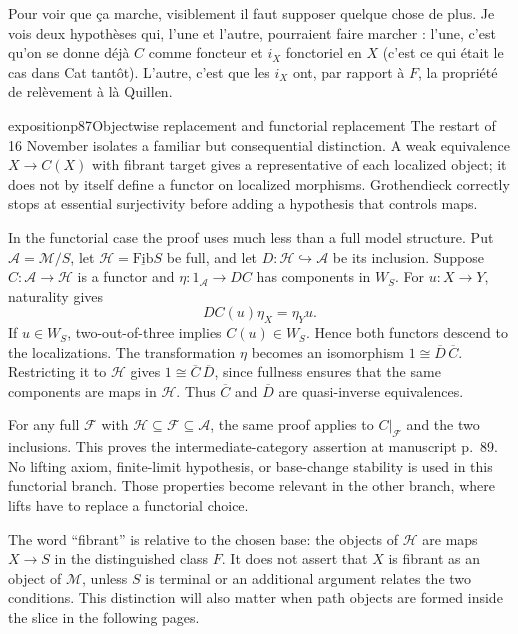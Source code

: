 Pour voir que ça marche, visiblement il faut supposer quelque chose de plus. Je vois deux
hypothèses qui, l'une et l'autre, pourraient faire marcher : l'une, c'est qu'on se donne
déjà $C$ comme foncteur et $i_X$ fonctoriel en $X$ (c'est ce qui était le cas dans Cat tantôt).
L'autre, c'est que
les $i_X$ ont, par rapport à $F$, la propriété de relèvement à là Quillen. %

\begin{dcomment}{exposition}{p87}{Objectwise replacement and functorial replacement}
The restart of 16 November isolates a familiar but consequential distinction. A weak equivalence $X\to C(X)$ with fibrant target gives a representative of each localized object; it does not by itself define a functor on localized morphisms. Grothendieck correctly stops at essential surjectivity before adding a hypothesis that controls maps.

In the functorial case the proof uses much less than a full model structure. Put $\mathcal A=\mathcal M/S$, let $\mathcal H=\underline{\mathrm{Fib}}S$ be full, and let $D:\mathcal H\hookrightarrow\mathcal A$ be its inclusion. Suppose $C:\mathcal A\to\mathcal H$ is a functor and $\eta:1_{\mathcal A}\to DC$ has components in $W_S$. For $u:X\to Y$, naturality gives
\[
 DC(u)\eta_X=\eta_Yu.
\]
If $u\in W_S$, two-out-of-three implies $C(u)\in W_S$. Hence both functors descend to the localizations. The transformation $\eta$ becomes an isomorphism $1\cong\overline D\,\overline C$. Restricting it to $\mathcal H$ gives $1\cong\overline C\,\overline D$, since fullness ensures that the same components are maps in $\mathcal H$. Thus $\overline C$ and $\overline D$ are quasi-inverse equivalences.

For any full $\mathcal F$ with $\mathcal H\subseteq\mathcal F\subseteq\mathcal A$, the same proof applies to $C|_{\mathcal F}$ and the two inclusions. This proves the intermediate-category assertion at manuscript p.~89. No lifting axiom, finite-limit hypothesis, or base-change stability is used in this functorial branch. Those properties become relevant in the other branch, where lifts have to replace a functorial choice.

The word ``fibrant'' is relative to the chosen base: the objects of $\mathcal H$ are maps $X\to S$ in the distinguished class $F$. It does not assert that $X$ is fibrant as an object of $\mathcal M$, unless $S$ is terminal or an additional argument relates the two conditions. This distinction will also matter when path objects are formed inside the slice in the following pages.
\end{dcomment}


